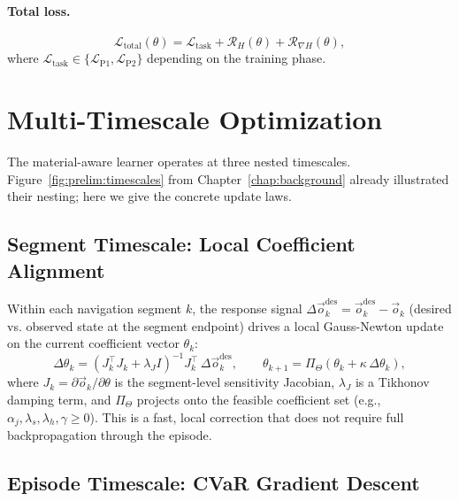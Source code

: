 \paragraph{Total loss.}
\begin{equation}
  \mathcal{L}_{\mathrm{total}}(\theta)
  = \mathcal{L}_{\mathrm{task}}
  + \mathcal{R}_H(\theta)
  + \mathcal{R}_{\nabla H}(\theta),
  \label{eq:ch4:L_total}
\end{equation}
where $\mathcal{L}_{\mathrm{task}} \in \{\mathcal{L}_{\mathrm{P1}},
\mathcal{L}_{\mathrm{P2}}\}$ depending on the training phase.

\section{Multi-Timescale Optimization}
\label{sec:ch4:multiscale}

The material-aware learner operates at three nested timescales.
Figure~\ref{fig:prelim:timescales} from Chapter~\ref{chap:background}
already illustrated their nesting; here we give the concrete update laws.

\subsection{Segment Timescale: Local Coefficient Alignment}
\label{subsec:ch4:segment}

Within each navigation segment $k$, the response signal
$\Delta \vec{o}_k^{\mathrm{des}} = \vec{o}_k^{\mathrm{des}} - \vec{o}_k$
(desired vs. observed state at the segment endpoint) drives a local
Gauss-Newton update on the current coefficient vector $\theta_k$:
\begin{equation}
  \Delta\theta_k
  = (J_k^\top J_k + \lambda_J I)^{-1} J_k^\top\,\Delta\vec{o}_k^{\mathrm{des}},
  \qquad
  \theta_{k+1} = \Pi_\Theta(\theta_k + \kappa\,\Delta\theta_k),
  \label{eq:ch4:segment_update}
\end{equation}
where $J_k = \partial\vec{o}_k/\partial\theta$ is the segment-level
sensitivity Jacobian, $\lambda_J$ is a Tikhonov damping term, and
$\Pi_\Theta$ projects onto the feasible coefficient set
(e.g., $\alpha_j, \lambda_s, \lambda_h, \gamma \geq 0$).
This is a fast, local correction that does not require full
backpropagation through the episode.

\subsection{Episode Timescale: CVaR Gradient Descent}
\label{subsec:ch4:episode}

